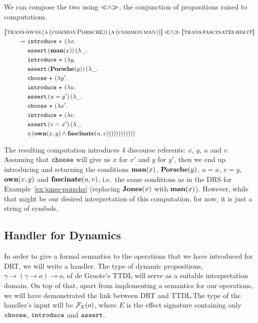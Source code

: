 We can compose the two using $\mathbin{\ll\!\!\land\!\!\gg}$, the conjunction of propositions
raised to computations.

\begin{align*}
  \llbracket \textsc{trans}\,&\textsc{owns}\,(\textsc{a}\,(\textsc{common}\,\textsc{Porsche}))\,(\textsc{a}\,(\textsc{common}\,\textsc{man})) \rrbracket \mathbin{\ll\!\!\land\!\!\gg} \llbracket \textsc{trans}\,\textsc{fascinates}\,\textsc{him}\,\textsc{it} \rrbracket \\
  \twoheadrightarrow &\ \mathtt{introduce}\,\star\,(\lambda x.\,  \\
       &\ \mathtt{assert}\,(\textbf{man}(x))\,(\lambda \_.\,  \\
       &\ \mathtt{introduce}\,\star\,(\lambda y.\,  \\
       &\ \mathtt{assert}\,(\textbf{Porsche}(y))\,(\lambda \_.\,  \\
       &\ \mathtt{choose}\,\star\,(\lambda y'.\,  \\
       &\ \mathtt{introduce}\,\star\,(\lambda u.\,  \\
       &\ \mathtt{assert}\,(u = y')\,(\lambda \_.\,  \\
       &\ \mathtt{choose}\,\star\,(\lambda x'.\,  \\
       &\ \mathtt{introduce}\,\star\,(\lambda v.\,  \\
       &\ \mathtt{assert}\,(v = x')\,(\lambda \_.\,  \\
       &\ \eta\,(\textbf{own}(x, y) \land \textbf{fascinate}(u, v))))))))))))
\end{align*}

The resulting computation introduces 4 discourse referents: $x$, $y$, $u$
and $v$. Assuming that $\mathtt{choose}$ will give us $x$ for $x'$ and $y$ for
$y'$, then we end up introducing and returning the conditions
$\textbf{man}(x)$, $\textbf{Porsche}(y)$, $u = x$, $v = y$, $\textbf{own}(x, y)$ and
$\textbf{fascinate}(u, v)$, i.e.\ the same conditions as in the DRS for
Example~\ref{ex:jones-porsche} (replacing $\textbf{Jones}(x)$ with
$\textbf{man}(x)$). However, while that might be our desired interpretation of
this computation, for now, it is just a string of symbols.


\subsection{Handler for Dynamics}
\label{ssec:handler-for-dynamics}

In order to give a formal semantics to the operations that we have
introduced for DRT, we will write a handler. The type of dynamic
propositions, $\gamma \to (\gamma \to o) \to o$, of de Groote's TTDL will
serve as a suitable interpretation domain. On top of that, apart from
implementing a semantics for our operations, we will have demonstrated the
link between DRT and TTDL.\@ The type of the handler's input will be
$\mathcal{F}_E(o)$, where $E$ is the effect signature containing only
$\mathtt{choose}$, $\mathtt{introduce}$ and $\mathtt{assert}$.

